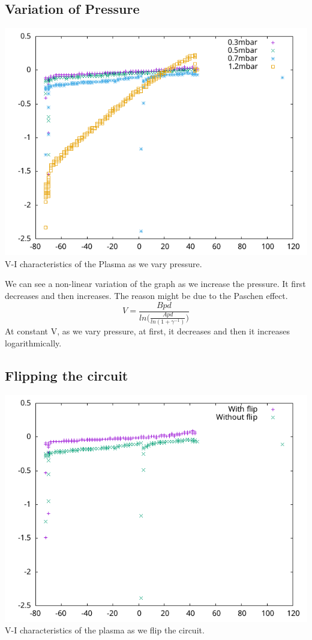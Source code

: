 \documentclass[]{report}[12 pt]
\begin{document}
\subsection*{Variation of Pressure}
\begin{center}
	\includegraphics{variationpressure.png}\\
	V-I characteristics of the Plasma as we vary pressure.
\end{center}
We can see a non-linear variation of the graph as we increase the pressure. It first decreases and then increases. The reason might be due to the Paschen effect.
\[V = \frac{Bpd}{ln\bigg(\frac{Apd}{ln(1+\gamma^{-1})}\bigg)}\] 
At constant V, as we vary pressure, at first, it decreases and then it increases logarithmically.
\subsection*{Flipping the circuit}
\begin{center}
	\includegraphics{flipping.png}\\
	V-I characteristics of the plasma as we flip the circuit.
\end{center}
\end{document}
